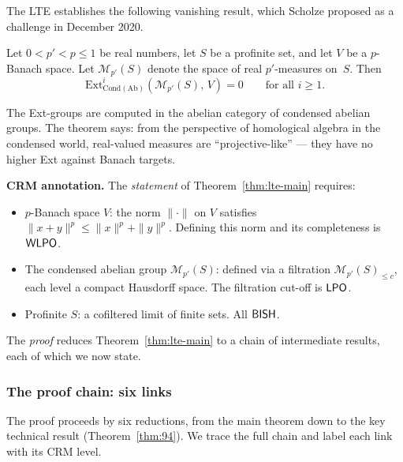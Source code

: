 The LTE establishes the following vanishing result, which
Scholze proposed as a challenge in December 2020.

\begin{theorem}\label{thm:lte-main}
Let $0 < p' < p \leq 1$ be real numbers, let $S$ be a profinite set,
and let $V$ be a $p$-Banach space.  Let $\mathcal{M}_{p'}(S)$ denote
the space of real $p'$-measures on~$S$.  Then
\[
  \mathrm{Ext}^i_{\mathrm{Cond}(\mathrm{Ab})}(\mathcal{M}_{p'}(S),\, V) = 0
  \qquad \text{for all } i \geq 1.
\]
\end{theorem}

The Ext-groups are computed in the abelian category of condensed
abelian groups.  The theorem says: from the perspective of homological
algebra in the condensed world, real-valued measures are
``projective-like'' --- they have no higher Ext against Banach targets.

\medskip
\noindent\textbf{CRM annotation.}
The \emph{statement} of Theorem~\ref{thm:lte-main} requires:
\begin{itemize}[nosep]
\item $p$-Banach space $V$: the norm $\|\cdot\|$ on $V$ satisfies
  $\|x + y\|^p \leq \|x\|^p + \|y\|^p$.  Defining
  this norm and its completeness is $\textsf{WLPO}$.
\item The condensed abelian group $\mathcal{M}_{p'}(S)$:
  defined via a filtration $\mathcal{M}_{p'}(S)_{\leq c}$, each
  level a compact Hausdorff space.  The filtration cut-off is $\textsf{LPO}$.
\item Profinite $S$: a cofiltered limit of finite sets.  All $\textsf{BISH}$.
\end{itemize}

\noindent The \emph{proof} reduces Theorem~\ref{thm:lte-main} to a
chain of intermediate results, each of which we now state.

\subsubsection{The proof chain: six links}\label{sec:proof-chain}

The proof proceeds by six reductions, from the main theorem down to
the key technical result (Theorem~\ref{thm:94}).  We trace the full
chain and label each link with its CRM level.

